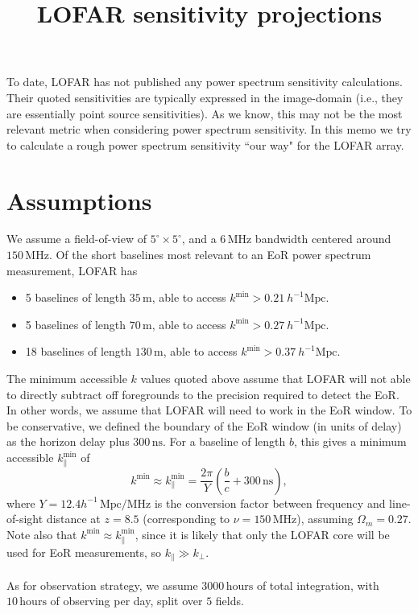 \documentclass[11pt]{article}
\begin{document}
\title{LOFAR sensitivity projections}


\maketitle
\noindent

To date, LOFAR has not published any power spectrum sensitivity calculations.  Their quoted sensitivities are typically expressed in the image-domain (i.e., they are essentially point source sensitivities).  As we know, this may not be the most relevant metric when considering power spectrum sensitivity.  In this memo we try to calculate a rough power spectrum sensitivity ``our way" for the LOFAR array.
\section{Assumptions}We assume a field-of-view of $5^\circ \times 5^\circ$, and a $6\,\textrm{MHz}$ bandwidth centered around $150\,\textrm{MHz}$.  Of the short baselines most relevant to an EoR power spectrum measurement, LOFAR has
\begin{itemize}
\item 5 baselines of length $35\,\textrm{m}$, able to access $k^\textrm{min} > 0.21~h^{-1}\textrm{Mpc}$.
\item 5 baselines of length $70\,\textrm{m}$, able to access $k^\textrm{min} > 0.27~h^{-1}\textrm{Mpc}$.
\item 18 baselines of length $130\,\textrm{m}$, able to access $k^\textrm{min} > 0.37~h^{-1}\textrm{Mpc}$.
\end{itemize}
The minimum accessible $k$ values quoted above assume that LOFAR will not able to directly subtract off foregrounds to the precision required to detect the EoR.  In other words, we assume that LOFAR will need to  work in the EoR window.  To be conservative, we defined the boundary of the EoR window (in units of delay) as the horizon delay plus $300\,\textrm{ns}$.  For a baseline of length $b$, this gives a minimum accessible $k_\parallel^\textrm{min}$ of
\begin{equation}
k^\textrm{min} \approx k_\parallel^\textrm{min} = \frac{2\pi}{Y} \left( \frac{b}{c} + 300\,\textrm{ns} \right),
\end{equation}
where $Y = 12.4 h^{-1}\,\textrm{Mpc}/\textrm{MHz}$ is the conversion factor between frequency and line-of-sight distance at $z=8.5$ (corresponding to $\nu=150\,\textrm{MHz}$), assuming $\Omega_m=0.27$.  Note also that $k^\textrm{min} \approx k_\parallel^\textrm{min}$, since it is likely that only the LOFAR core will be used for EoR measurements, so $k_\parallel \gg k_\perp$.\\
\\
As for observation strategy, we assume $3000\,\textrm{hours}$ of total integration, with $10\,\textrm{hours}$ of observing per day, split over $5$ fields.
\end{document}
